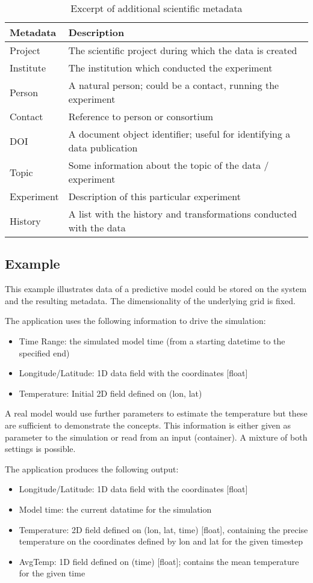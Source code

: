 \begin{table}
\begin{tabular}{ll}
Metadata & Description\\
\hline
Project & The scientific project during which the data is created \\
Institute & The institution which conducted the experiment\\
Person &  A natural person; could be a contact, running the experiment \\
Contact & Reference to person or consortium \\
DOI      & A document object identifier; useful for identifying a data publication\\
Topic     & Some information about the topic of the data / experiment \\
Experiment & Description of this particular experiment \\
History & A list with the history and transformations conducted with the data \\
\end{tabular}
\caption{Excerpt of additional scientific metadata}
\label{tbl:additionalMetadata}
\end{table}



\subsection{Example}

This example illustrates data of a predictive model could be stored on the system and the resulting metadata.
The dimensionality of the underlying grid is fixed.

The application uses the following information to drive the simulation:
\begin{itemize}
	\item Time Range: the simulated model time (from a starting datetime to the specified end)
	\item Longitude/Latitude: 1D data field with the coordinates [float]
	\item Temperature: Initial 2D field defined on (lon, lat)
\end{itemize}
A real model would use further parameters to estimate the temperature but these are sufficient to demonstrate the concepts.
This information is either given as parameter to the simulation or read from an input (container).
A mixture of both settings is possible.


The application produces the following output:
\begin{itemize}
	\item Longitude/Latitude: 1D data field with the coordinates [float]
	\item Model time: the current datatime for the simulation
	\item Temperature: 2D field defined on (lon, lat, time) [float], containing the precise temperature on the coordinates defined by lon and lat for the given timestep
	\item AvgTemp: 1D field defined on (time) [float]; contains the mean temperature for the given time
\end{itemize}

